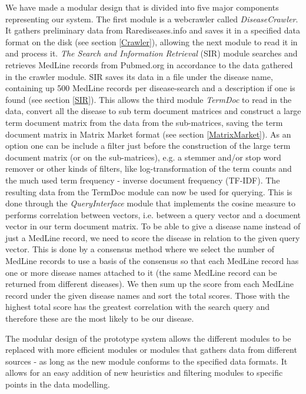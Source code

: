 We have made a modular design that is divided into five major
components representing our system. The first module is a webcrawler
called \textit{DiseaseCrawler}. It gathers preliminary data from
Rarediseases.info and saves it in a specified data format on the disk
(see section \ref{Crawler}), allowing the next module to read it in
and process it. \textit{The Search and Information Retrieval} (SIR)
module searches and retrieves MedLine records from Pubmed.org in
accordance to the data gathered in the crawler module. SIR saves its
data in a file under the disease name, containing up 500 MedLine
records per disease-search and a description if one is found (see
section \ref{SIR}). This allows the third module \textit{TermDoc} to
read in the data, convert all the disease to sub term document
matrices and construct a large term document matrix from the data from
the sub-matrices, saving the term document matrix in Matrix Market
format (see section \ref{MatrixMarket}). As an option one can be include a filter
just before the construction of the large term document matrix (or on
the sub-matrices), e.g. a stemmer and/or stop word remover or other
kinds of filters, like log-transformation of the term counts and the
much used term frequency - inverse document frequency (TF-IDF). The
resulting data from the TermDoc module can now be used for
querying. This is done through the \textit{QueryInterface} module that
implements the cosine measure to performs correlation between vectors,
i.e. between a query vector and a document vector in our term document
matrix. To be able to give a disease name instead of just a MedLine
record, we need to score the disease in relation to the given query
vector. This is done by a consensus method where we select the number
of MedLine records to use a basis of the consensus so that each
MedLine record has one or more disease names attached to it (the same
MedLine record can be returned from different diseases). We then sum
up the score from each MedLine record under the given disease names
and sort the total scores. Those with the highest total score has the
greatest correlation with the search query and therefore these are the
most likely to be our disease.

The modular design of the prototype system allows the different
modules to be replaced with more efficient modules or modules that
gathers data from different sources - as long as the new module
conforms to the specified data formats. It allows for an easy addition
of new heuristics and filtering modules to specific points in the data
modelling.

